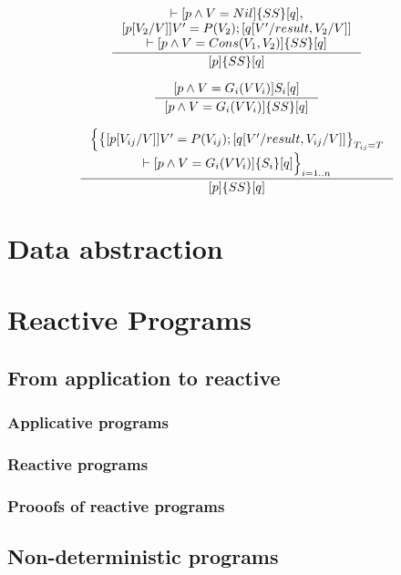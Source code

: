 \documentclass[12pt, a4paper]{book}
\begin{document}
  $$
  \inference{
    \vdash [p \land V = Nil] \{SS\} [q], \\
    [p[V_{2}/V]] V' = P(V_2); [q[V'/result, V_{2}/V]] \\
    \vdash [p \land V = Cons(V_1, V_2)] \{SS\} [q]
  }
  {[p] \{SS\} [q]}
  $$

  $$
  \inference{[p \land V = G_{i}(VV_{i})] S_{i} [q]}
  {[ p \land V = G_{i}(VV_{i})] \{SS\} [q]}
  $$

  $$
  \inference{
    \Big\lbrace \big\lbrace [p[V_{ij}/V]] V' = P(V_{ij}); [q[V'/result, V_{ij}/V]] \big\rbrace_{T_{ij}=T} \\
    \vdash [p \land V = G_{i}(VV_{i})] \{S_{i}\} [q] \Big\rbrace_{i=1..n}
  }
  {[p] \lbrace SS \rbrace [q]}
  $$

  \section{Data abstraction}
  \label{sec:Data abstraction}

  



  \section{Reactive Programs}
  \label{sec:Reactive Programs}
  \subsection{From application to reactive}
  \label{sub:From application to reactive}
  \subsubsection{Applicative programs}
  \label{subs:Applicative programs}
  \subsubsection{Reactive programs}
  \label{subs:Reactive programs}
  \subsubsection{Prooofs of reactive programs}
  \label{subs:Proofs of reactive programs}
  \subsection{Non-deterministic programs}
  \label{sub:Non-deterministic programs}
\end{document}
